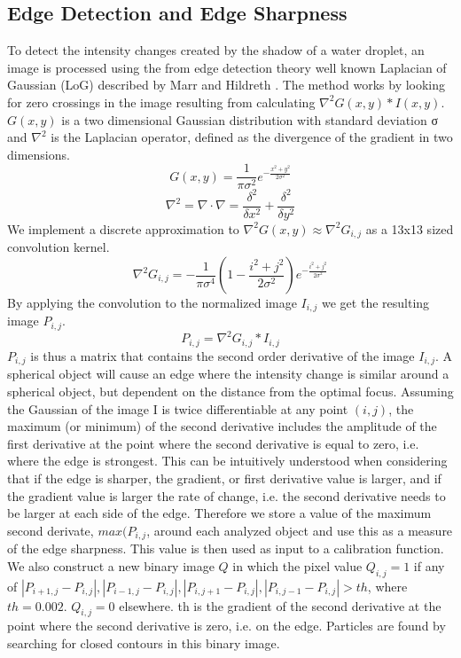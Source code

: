 \subsection{Edge Detection and Edge Sharpness}

To detect the intensity changes created by the shadow of a water droplet, an image is processed using the from edge detection theory well known Laplacian of Gaussian (LoG) described by Marr and Hildreth \cite{marr1980}. The method works by looking for zero crossings in the image resulting from calculating $\nabla^2 G\left(x,y\right) * I\left(x,y\right)$. $G\left(x,y\right)$ is a two dimensional Gaussian distribution with standard deviation σ and $\nabla^2$ is the Laplacian operator, defined as the divergence of the gradient in two dimensions.
\begin{equation}
G\left(x,y\right) = \frac{1}{\pi \sigma^2} e^{-\frac{x^2+y^2}{2\sigma^2}}
\end{equation}
\begin{equation}
\nabla^2=\nabla\cdot\nabla=\frac{\delta^2}{\delta x^2} + \frac{\delta^2}{\delta y^2}
\end{equation}
We implement a discrete approximation to $\nabla^2 G\left(x,y\right) \approx \nabla^2 G_{i,j}$ as a 13x13 sized convolution kernel.
\begin{equation}
\nabla^2 G_{i,j} = -\frac{1}{\pi \sigma^4} \left(1 - \frac{i^2+j^2}{2\sigma^2} \right) e^{-\frac{i^2+j^2}{2\sigma^2}}
\end{equation}
By applying the convolution to the normalized image $I_{i,j}$ we get the resulting image $P_{i,j}$.
\begin{equation}
P_{i,j}=\nabla^2 G_{i,j} * I_{i,j}
\end{equation}
$P_{i,j}$ is thus a matrix that contains the second order derivative of the image $I_{i,j}$. 
A spherical object will cause an edge where the intensity change is similar around a spherical object, but dependent on the distance from the optimal focus. Assuming the Gaussian of the image I is twice differentiable at any point $(i,j)$, the maximum (or minimum) of the second derivative includes the amplitude of the first derivative at the point where the second derivative is equal to zero, i.e. where the edge is strongest. This can be intuitively understood when considering that if the edge is sharper, the gradient, or first derivative value is larger, and if the gradient value is larger the rate of change, i.e. the second derivative needs to be larger at each side of the edge. Therefore we store a value of the maximum second derivate, $max(P_{i,j}$, around each analyzed object and use this as a measure of the edge sharpness. This value is then used as input to a calibration function. 
We also construct a new binary image $Q$ in which the pixel value $Q_{i,j}=1$ if any of $|P_{i+1,j}-P_{i,j} |,|P_{i-1,j}-P_{i,j} |,|P_{i,j+1}-P_{i,j} |,|P_{i,j-1}-P_{i,j} |>th$, where $th=0.002$. $Q_{i,j}=0$ elsewhere. th is the gradient of the second derivative at the point where the second derivative is zero, i.e. on the edge. Particles are found by searching for closed contours in this binary image.

